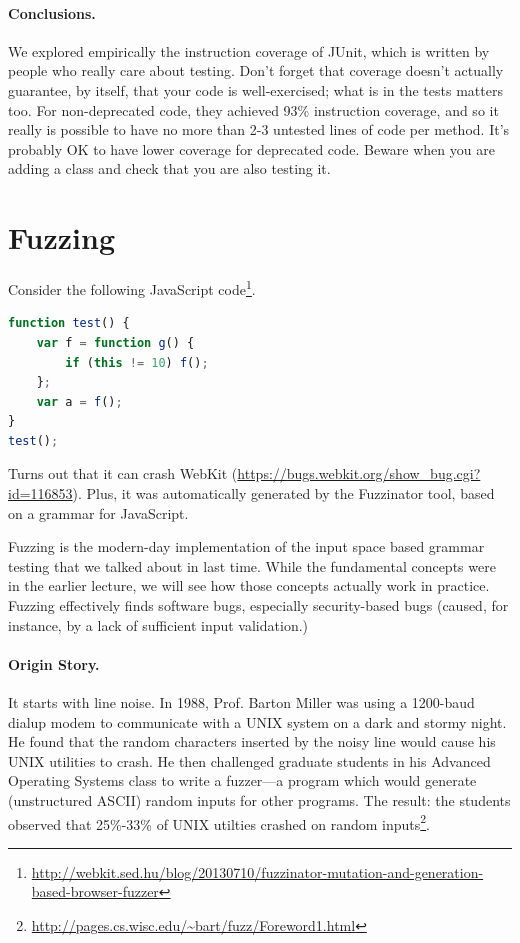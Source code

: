 \documentclass[11pt]{article}
\begin{document}
\paragraph*{Conclusions.} We explored empirically the instruction coverage of JUnit,
which is written by people who really care about testing. Don't forget
that coverage doesn't actually guarantee, by itself, that your code is
well-exercised; what is in the tests matters too. For non-deprecated
code, they achieved 93\% instruction coverage, and so it really is
possible to have no more than 2-3 untested lines of code per
method. It's probably OK to have lower coverage for deprecated
code. Beware when you are adding a class and check that you are also
testing it.



\section*{Fuzzing}

Consider the following JavaScript code\footnote{\url{http://webkit.sed.hu/blog/20130710/fuzzinator-mutation-and-generation-based-browser-fuzzer}}.
\begin{lstlisting}[language=JavaScript]
function test() {
    var f = function g() {
        if (this != 10) f();
    };
    var a = f();
}
test();
\end{lstlisting}
Turns out that it can crash WebKit (\url{https://bugs.webkit.org/show_bug.cgi?id=116853}).
Plus, it was automatically generated by the Fuzzinator tool, based on a grammar for JavaScript.

Fuzzing is the modern-day implementation of the input space based
grammar testing that we talked about in last time. While the
fundamental concepts were in the earlier lecture, we will see how
those concepts actually work in practice.  Fuzzing effectively finds
software bugs, especially security-based bugs (caused, for instance,
by a lack of sufficient input validation.)

\paragraph{Origin Story.} It starts with line noise.
In 1988, Prof. Barton Miller was using a 1200-baud dialup modem to
communicate with a UNIX system on a dark and stormy night.  He found
that the random characters inserted by the noisy line would cause his
UNIX utilities to crash. He then challenged graduate students in his
Advanced Operating Systems class to write a fuzzer---a program which
would generate (unstructured ASCII) random inputs for other programs.
The result: the students observed that 25\%-33\% of UNIX utilties
crashed on random inputs\footnote{\url{http://pages.cs.wisc.edu/~bart/fuzz/Foreword1.html}}.
\end{document}
